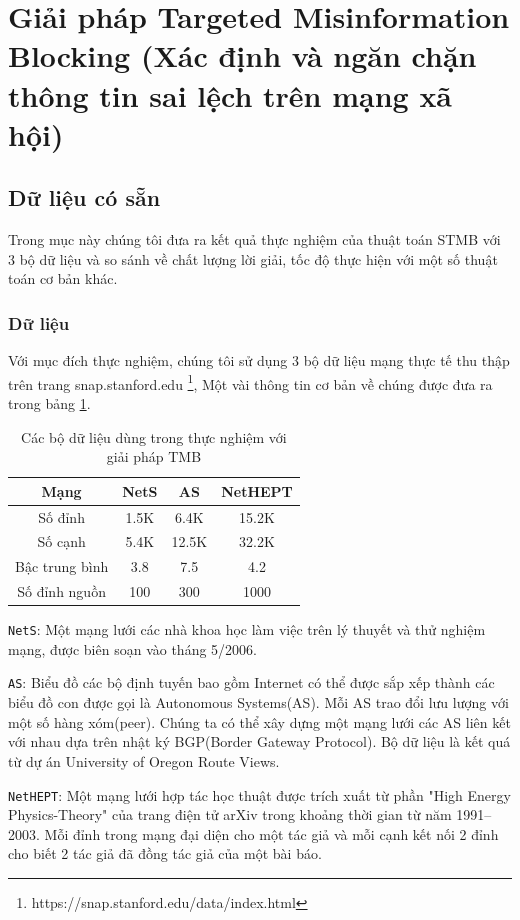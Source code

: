 \section{Giải pháp Targeted Misinformation Blocking (Xác định và ngăn chặn thông tin sai lệch trên mạng xã hội)}
\subsection{Dữ liệu có sẵn}	

Trong mục này chúng tôi đưa ra kết quả thực nghiệm của thuật toán STMB với 3 bộ dữ liệu và so sánh về chất lượng lời giải, tốc độ thực hiện với một số thuật toán cơ bản khác.
\subsubsection{Dữ liệu}
Với mục đích thực nghiệm, chúng tôi sử dụng 3 bộ dữ liệu mạng thực tế thu thập trên trang snap.stanford.edu \footnote{https://snap.stanford.edu/data/index.html}, Một vài thông tin cơ bản về chúng được đưa ra trong bảng \ref{TMB:table}. 
\begin{table}[h]
	\centering
	\begin{tabular}{|c|c|c|c|}
		\hline 
		Mạng & NetS & AS & NetHEPT\\ 
		\hline 
		Số đỉnh & 1.5K & 6.4K & 15.2K \\ 
		\hline 
		Số cạnh & 5.4K & 12.5K & 32.2K\\ 
		\hline 
		Bậc trung bình & 3.8 & 7.5 & 4.2\\ 
		\hline 
		Số đỉnh nguồn & 100 & 300 & 1000\\ 
		\hline 
	\end{tabular} 
	\caption{Các bộ dữ liệu dùng trong thực nghiệm với giải pháp TMB}
	\label{TMB:table}
\end{table}

\texttt{NetS}\cite{NetS}: Một mạng lưới các nhà khoa học làm việc trên lý thuyết và thử nghiệm mạng, được biên soạn vào tháng 5/2006.

\texttt{AS}\cite{AS}: Biểu đồ các bộ định tuyến bao gồm Internet có thể được sắp xếp thành các biểu đồ con được gọi là Autonomous Systems(AS). Mỗi AS trao đổi lưu lượng với một số hàng xóm(peer). Chúng ta có thể xây dựng một mạng lưới các AS liên kết với nhau dựa trên nhật ký BGP(Border Gateway Protocol). Bộ dữ liệu là kết quá từ dự án University of Oregon Route Views. 

\texttt{NetHEPT}\cite{kemple1, chen10LT}: Một mạng lưới hợp tác học thuật được trích xuất từ phần "High Energy Physics-Theory" của trang điện tử arXiv trong khoảng thời gian từ năm 1991--2003. Mỗi đỉnh trong mạng đại diện cho một tác giả và mỗi cạnh kết nối 2 đỉnh cho biết 2 tác giả đã đồng tác giả của một bài báo.

